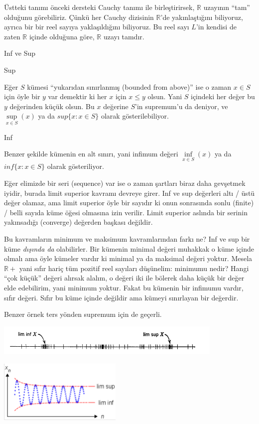 \documentclass[12pt,fleqn]{article}\usepackage{../../common}
\begin{document}
Üstteki tanımı önceki dersteki Cauchy tanımı ile birleştirirsek, $\mathbb{R}$
uzayının ``tam'' olduğunu görebiliriz. Çünkü her Cauchy dizisinin
$\mathbb{R}$'de yakınlaştığını biliyoruz, ayrıca bir bir reel sayıya
yaklaşıldığını biliyoruz. Bu reel sayı $L$'in kendisi de zaten $\mathbb{R}$
içinde olduğuna göre, $\mathbb{R}$ uzayı tamdır.

Inf ve Sup

Sup

Eğer $S$ kümesi ``yukarıdan sınırlanmış (bounded from above)'' ise o zaman $x
\in S$ için öyle bir $y$ var demektir ki her $x$ için $x \le y$ olsun. Yani $S$
içindeki her değer bu $y$ değerinden küçük olsun. Bu $x$ değerine $S$'in
supremum'u da deniyor, ve $\sup\limits_{x \in S}(x)$ ya da $sup\{x:x \in S\}$
olarak gösterilebiliyor.

Inf

Benzer şekilde kümenin en alt sınırı, yani infimum değeri $\inf\limits_{x \in
 S}(x)$ ya da $inf\{x:x \in S\}$ olarak gösteriliyor.

Eğer elimizde bir seri (sequence) var ise o zaman şartları biraz daha gevşetmek
iyidir, burada limit superior kavramı devreye girer. Inf ve sup değerleri altı /
üstü değer olamaz, ama limit superior öyle bir sayıdır ki onun sonrasında sonlu
(finite) / belli sayıda küme öğesi olmasına izin verilir. Limit superior aslında
bir serinin yakınsadığı (converge) değerden başkası değildir.

Bu kavramların minimum ve maksimum kavramlarından farkı ne? Inf ve sup bir küme
{\em dışında da} olabilirler. Bir kümenin minimal değeri muhakkak o küme içinde
olmalı ama öyle kümeler vardır ki minimal ya da maksimal değeri yoktur. Mesela
$\mathbb{R}+$ yani sıfır hariç tüm pozitif reel sayıları düşünelim: minimumu
nedir? Hangi ``çok küçük'' değeri alırsak alalım, o değeri iki ile bölerek daha
küçük bir değer elde edebilirim, yani minimum yoktur. Fakat bu kümenin bir
infimumu vardır, sıfır değeri. Sıfır bu küme içinde değildir ama kümeyi
sınırlayan bir değerdir.

Benzer örnek ters yönden supremum için de geçerli. 

\includegraphics[height=1.5cm]{2_1.png}

\includegraphics[height=3cm]{2_2.png}
\end{document}
